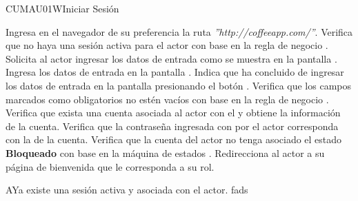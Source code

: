 \begin{UseCase}{CUMAU01W}{Iniciar Sesión}
{\begin{Titemize}
		\Titem {}
	\end{Titemize}}
	\end{UseCase}
	
	
	\begin{UCtrayectoria}
		\UCpaso[\UCactor] Ingresa en el navegador de su preferencia la ruta \textit{''http://coffeeapp.com/''}.
		\UCpaso Verifica que no haya una sesión activa para el actor con base en la regla de negocio .
		\UCpaso Solicita al actor ingresar los datos de entrada como se muestra en la pantalla .
		\UCpaso[\UCactor] Ingresa los datos de entrada en la pantalla .
		\UCpaso[\UCactor] Indica que ha concluido de ingresar los datos de entrada en la pantalla  presionando el botón .
		\UCpaso Verifica que los campos marcados como obligatorios no estén vacíos con base en la regla de negocio .
		\UCpaso Verifica que exista una cuenta asociada al actor con el  y obtiene la información de la cuenta.
		\UCpaso Verifica que la contraseña ingresada con por el actor corresponda con la  de la cuenta.
		\UCpaso Verifica que la cuenta del actor no tenga asociado el estado \textbf{Bloqueado} con base en la máquina de estados .
		\UCpaso Redirecciona al actor a su página de bienvenida que le corresponda a su rol.	\end{UCtrayectoria}
	

	\begin{UCtrayectoriaA}{A}{Ya existe una sesión activa y asociada con el actor.}
		\UCpaso fads
	
	\end{UCtrayectoriaA}
	